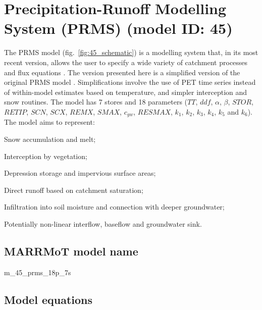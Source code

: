 \section{Precipitation-Runoff Modelling System (PRMS) (model ID: 45)}
The PRMS model (fig.~\ref{fig:45_schematic}) is a modelling system that, in its most recent version, allows the user to specify a wide variety of catchment processes and flux equations \citep{Markstrom2015}. The version presented here is a simplified version of the original PRMS model \citep{Leavesley1983}. Simplifications involve the use of PET time series instead of within-model estimates based on temperature, and simpler interception and snow routines. The model has 7 stores and 18 parameters ($TT$, $ddf$, $\alpha$, $\beta$, $STOR$, $RETIP$, $SCN$, $SCX$, $REMX$, $SMAX$, $c_{gw}$, $RESMAX$, $k_1$, $k_2$, $k_3$, $k_4$, $k_5$ and $k_6$). The model aims to represent:

\begin{itemizecompact}
\item Snow accumulation and melt;
\item Interception by vegetation;
\item Depression storage and impervious surface areas;
\item Direct runoff based on catchment saturation;
\item Infiltration into soil moisture and connection with deeper groundwater;
\item Potentially non-linear interflow, baseflow and groundwater sink.
\end{itemizecompact}

\subsection{MARRMoT model name}
m\_45\_prms\_18p\_7s \\

\subsection{Model equations}

